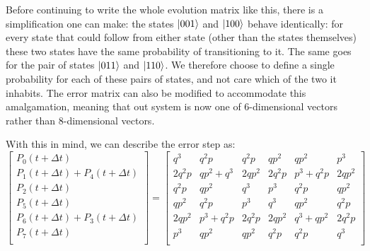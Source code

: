 \documentclass{report}
\begin{document}
\begin{appendices}
Before continuing to write the whole evolution matrix like this, there is a simplification one can make: the states $\ket{001}$ and $\ket{100}$ behave identically: for every state that could follow from either state (other than the states themselves) these two states have the same probability of transitioning to it. The same goes for the pair of states $\ket{011}$ and $\ket{110}$. We therefore choose to define a single probability for each of these pairs of states, and not care which of the two it inhabits. The error matrix can also be modified to accommodate this amalgamation, meaning that out system is now one of 6-dimensional vectors rather than 8-dimensional vectors.

With this in mind, we can describe the error step as:
\begin{equation} \label{eq:Ematrix}
    \begin{bmatrix}
        P_0(t+\Delta t) \\
        P_1(t+\Delta t) + P_4(t+\Delta t) \\
        P_2(t+\Delta t) \\
        P_5(t+\Delta t) \\
        P_6(t+\Delta t)  + P_3(t + \Delta t)\\
        P_7(t+\Delta t) \\
    \end{bmatrix}
    =
    \begin{bmatrix}
        q^3& q^2p& q^2p& qp^2& qp^2& p^3 \\
        2 q^2p& qp^2 + q^3& 2 qp^2& 2 q^2p& p^3 + q^2p& 2 qp^2\\
        q^2p& qp^2& q^3& p^3& q^2p& qp^2\\
        qp^2& q^2p& p^3& q^3& qp^2& q^2p\\
        2 qp^2& p^3 + q^2p& 2 q^2p& 2 qp^2& q^3 + qp^2& 2 q^2p\\
        p^3& qp^2& qp^2& q^2p& q^2p& q^3\\


\end{bmatrix}
\end{equation}
\end{appendices}
\end{document}
